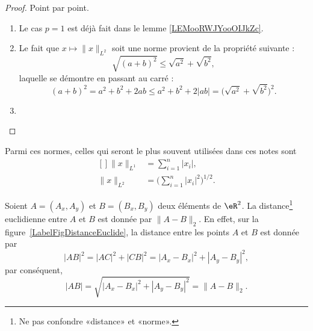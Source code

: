 \begin{proof}
    Point par point.
    \begin{enumerate}
        \item
            Le cas \( p=1\) est déjà fait dans le lemme \ref{LEMooRWJYooOIJkZc}.
        \item
    Le fait que \( x\mapsto\| x \|_{L^2}\) soit une norme provient de la propriété suivante :
    \begin{equation}
        \sqrt{ (a+b)^2 }\leq \sqrt{ a^2 }+\sqrt{ b^2 },
    \end{equation}
    laquelle se démontre en passant au carré :
    \begin{equation}        \label{EQooRYNYooTzZpPz}
        (a+b)^2=a^2+b^2+2ab\leq a^2+b^2+2| ab |=\big( \sqrt{ a^2 }+\sqrt{ b^2 } \big)^2.
    \end{equation}
\item
    \end{enumerate}
\end{proof}

Parmi ces normes, celles qui seront le plus souvent utilisées dans ces notes sont
\begin{equation}
	\begin{aligned}[]
		\| x \|_{L^1}&=\sum_{i=1}^n| x_i |,\\
		\| x \|_{L^2}&=\Big( \sum_{i=1}^n| x_i |^2 \Big)^{1/2}.
	\end{aligned}
\end{equation}

\newcommand{\CaptionFigDistanceEuclide}{La \emph{norme} euclidienne induit la \emph{distance} euclidienne. D'où son nom. Le point $C$ est construit aux coordonnées $(A_x,B_y)$.}


Soient $A=(A_x,A_y)$ et $B=(B_x,B_y)$ deux éléments de $\eR^2$. La distance\footnote{Ne pas confondre «distance» et «norme».} euclidienne entre $A$ et $B$ est donnée par $\| A-B \|_2$. En effet, sur la figure~\ref{LabelFigDistanceEuclide}, la distance entre les points $A$ et $B$ est donnée par
\begin{equation}
	| AB |^2=| AC |^2+| CB |^2=| A_x-B_x |^2+| A_y-B_y |^2,
\end{equation}
par conséquent,
\begin{equation}
	| AB |=\sqrt{| A_x-B_x |^2+| A_y-B_y |^2}=\| A-B \|_2.
\end{equation}

